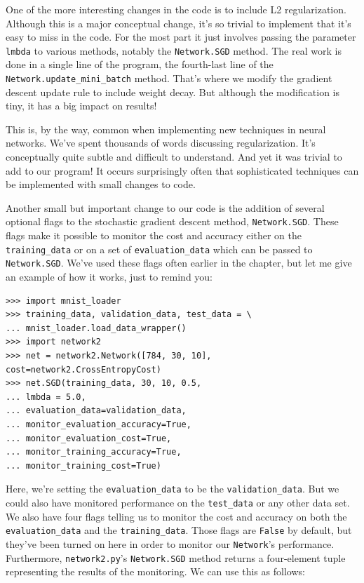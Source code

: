 One of the more interesting changes in the code is to include L2 regularization. Although this is a major conceptual change, it's so trivial to implement that it's easy to miss in the code. For the most part it just involves passing the parameter \texttt{lmbda} to various methods, notably the \texttt{Network.SGD} method. The real work is done in a single line of the program, the fourth-last line of the \texttt{Network.update\_\allowbreak{}mini\_\allowbreak{}batch} method. That's where we modify the gradient descent update rule to include weight decay. But although the modification is tiny, it has a big impact on results!


This is, by the way, common when implementing new techniques in neural networks. We've spent thousands of words discussing regularization. It's conceptually quite subtle and difficult to understand. And yet it was trivial to add to our program! It occurs surprisingly often that sophisticated techniques can be implemented with small changes to code.


Another small but important change to our code is the addition of several optional flags to the stochastic gradient descent method, \texttt{Network.SGD}. These flags make it possible to monitor the cost and accuracy either on the \texttt{training\_\allowbreak{}data} or on a set of \texttt{evaluation\_\allowbreak{}data} which can be passed to \texttt{Network.SGD}. We've used these flags often earlier in the chapter, but let me give an example of how it works, just to remind you:



\begin{lstlisting}
>>> import mnist_loader
>>> training_data, validation_data, test_data = \
... mnist_loader.load_data_wrapper()
>>> import network2
>>> net = network2.Network([784, 30, 10], cost=network2.CrossEntropyCost)
>>> net.SGD(training_data, 30, 10, 0.5,
... lmbda = 5.0,
... evaluation_data=validation_data,
... monitor_evaluation_accuracy=True,
... monitor_evaluation_cost=True,
... monitor_training_accuracy=True,
... monitor_training_cost=True)

\end{lstlisting}


Here, we're setting the \texttt{evaluation\_\allowbreak{}data} to be the \texttt{validation\_\allowbreak{}data}. But we could also have monitored performance on the \texttt{test\_\allowbreak{}data} or any other data set. We also have four flags telling us to monitor the cost and accuracy on both the \texttt{evaluation\_\allowbreak{}data} and the \texttt{training\_\allowbreak{}data}. Those flags are \texttt{False} by default, but they've been turned on here in order to monitor our \texttt{Network}'s performance. Furthermore, \texttt{network2.py}'s \texttt{Network.SGD} method returns a four-element tuple representing the results of the monitoring. We can use this as follows:




